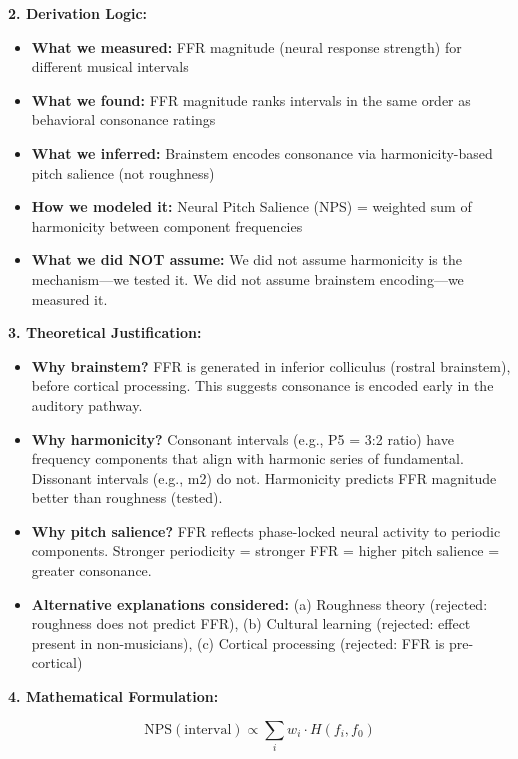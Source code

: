 \documentclass[9pt,onecolumn]{article}
\begin{document}
\textbf{2. Derivation Logic:}
\begin{itemize}[leftmargin=*, topsep=1pt, itemsep=1pt]
    \item \textbf{What we measured:} FFR magnitude (neural response strength) for different musical intervals
    \item \textbf{What we found:} FFR magnitude ranks intervals in the same order as behavioral consonance ratings
    \item \textbf{What we inferred:} Brainstem encodes consonance via harmonicity-based pitch salience (not roughness)
    \item \textbf{How we modeled it:} Neural Pitch Salience (NPS) = weighted sum of harmonicity between component frequencies
    \item \textbf{What we did NOT assume:} We did not assume harmonicity is the mechanism---we tested it. We did not assume brainstem encoding---we measured it.
\end{itemize}

\textbf{3. Theoretical Justification:}
\begin{itemize}[leftmargin=*, topsep=1pt, itemsep=1pt]
    \item \textbf{Why brainstem?} FFR is generated in inferior colliculus (rostral brainstem), before cortical processing. This suggests consonance is encoded early in the auditory pathway.
    \item \textbf{Why harmonicity?} Consonant intervals (e.g., P5 = 3:2 ratio) have frequency components that align with harmonic series of fundamental. Dissonant intervals (e.g., m2) do not. Harmonicity predicts FFR magnitude better than roughness (tested).
    \item \textbf{Why pitch salience?} FFR reflects phase-locked neural activity to periodic components. Stronger periodicity = stronger FFR = higher pitch salience = greater consonance.
    \item \textbf{Alternative explanations considered:} (a) Roughness theory (rejected: roughness does not predict FFR), (b) Cultural learning (rejected: effect present in non-musicians), (c) Cortical processing (rejected: FFR is pre-cortical)
\end{itemize}

\textbf{4. Mathematical Formulation:}

\begin{equation}
\text{NPS}(\text{interval}) \propto \sum_i w_i \cdot H(f_i, f_0)
\label{eq:nps}
\end{equation}
\end{document}
